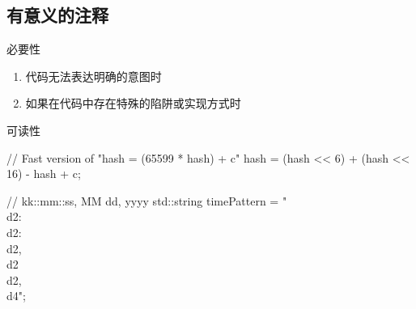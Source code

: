 \subsection{有意义的注释}

\begin{frame}[fragile]{必要性}
\begin{enumerate}
  \item 代码无法表达明确的意图时
  \item 如果在代码中存在特殊的陷阱或实现方式时
\end{enumerate}
\end{frame}

\begin{frame}[fragile]{可读性}
\begin{c++}
// Fast version of "hash = (65599 * hash) + c"
hash = (hash << 6) + (hash << 16) - hash + c;

// kk::mm::ss, MM dd, yyyy
std::string timePattern = "\\d{2}:\\d{2}:\\d{2}, \\d{2} \\d{2}, \\d{4}";
\end{c++}
\end{frame}
